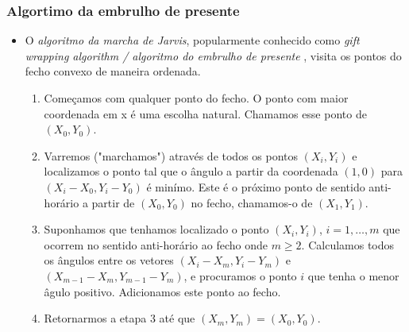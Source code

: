 \documentclass[12pt]{article}
\begin{document}
\bigskip
\subsubsection{Algortimo da embrulho de presente}

\begin{itemize}

\item O {\em algoritmo da marcha de Jarvis}, popularmente conhecido como {\em gift
wrapping algorithm / algoritmo do embrulho de presente} , visita os pontos do fecho convexo de maneira ordenada.

\begin{enumerate}

\item Começamos com qualquer ponto do fecho. O ponto com maior coordenada em x é uma escolha natural. Chamamos esse ponto de $(X_0, Y_0)$.

\item Varremos ("marchamos") através de todos os pontos $(X_i, Y_i)$ e localizamos o ponto tal que o ângulo a partir da coordenada $(1,0)$ para $(X_i - X_0, Y_i - Y_0)$ é minímo.
Este é o próximo ponto de sentido anti-horário a partir de $(X_0,Y_0)$ no fecho, chamamos-o de $(X_1, Y_1)$.

\item Suponhamos que tenhamos localizado o ponto $(X_i,Y_i)$, $i=1, \ldots, m$ que ocorrem no sentido anti-horário ao fecho onde $m \ge 2$.
Calculamos todos os ângulos entre os vetores $(X_i - X_m, Y_i - Y_m)$ e
$(X_{m-1} - X_m, Y_{m-1} - Y_m)$, e procuramos o ponto $i$ que tenha o menor âgulo positivo.  Adicionamos este ponto ao fecho.

\item Retornarmos a etapa 3 até que $(X_m,Y_m) = (X_0,Y_0)$.

\end{enumerate}

\begin{center}
\end{center}
\end{itemize}
\end{document}
